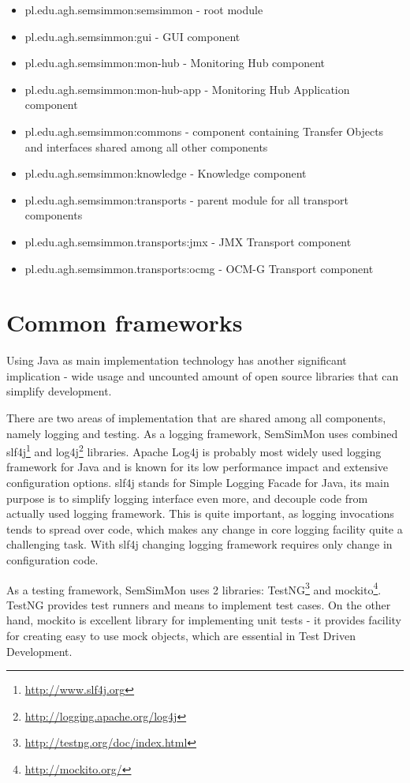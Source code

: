 \begin{itemize}
\item pl.edu.agh.semsimmon:semsimmon - root module
\item pl.edu.agh.semsimmon:gui - GUI component
\item pl.edu.agh.semsimmon:mon-hub - Monitoring Hub component
\item pl.edu.agh.semsimmon:mon-hub-app - Monitoring Hub Application component 
\item pl.edu.agh.semsimmon:commons - component containing Transfer Objects and interfaces shared among all other components
\item pl.edu.agh.semsimmon:knowledge - Knowledge component
\item pl.edu.agh.semsimmon:transports - parent module for all transport components
\item pl.edu.agh.semsimmon.transports:jmx - JMX Transport component
\item pl.edu.agh.semsimmon.transports:ocmg - OCM-G Transport component
\end{itemize}

\section{Common frameworks}

Using Java as main implementation technology has another significant implication - wide usage and uncounted amount of open source libraries that can simplify development.

There are two areas of implementation that are shared among all components, namely logging and testing. As a logging framework, SemSimMon uses combined slf4j\footnote{\url{http://www.slf4j.org}} and log4j\footnote{\url{http://logging.apache.org/log4j}} libraries. Apache Log4j is probably most widely used logging framework for Java and is known for its low performance impact and extensive configuration options. slf4j stands for Simple Logging Facade for Java, its main purpose is to simplify logging interface even more, and decouple code from actually used logging framework. This is quite important, as logging invocations tends to spread over code, which makes any change in core logging facility quite a challenging task. With slf4j changing logging framework requires only change in configuration code.

As a testing framework, SemSimMon uses 2 libraries: TestNG\footnote{\url{http://testng.org/doc/index.html}} and mockito\footnote{\url{http://mockito.org/}}. TestNG provides test runners and means to implement test cases. On the other hand, mockito is excellent library for implementing unit tests - it provides facility for creating easy to use mock objects, which are essential in Test Driven Development.





